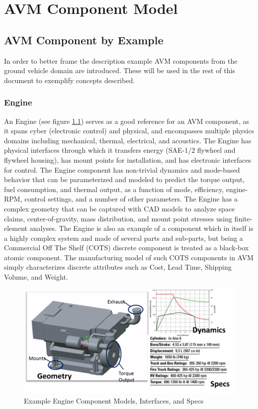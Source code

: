 \chapter{AVM Component Model}

\section{AVM Component by Example}
In order to better frame the description example AVM components from the ground vehicle domain are introduced. These will be used in the rest of this document to exemplify concepts described. 

\subsection{Engine}
An Engine (see figure \ref{Engine_Component}) serves as a good reference for an AVM component, as it spans cyber (electronic control) and physical, and encompasses multiple physics domains including mechanical, thermal, electrical, and acoustics. The Engine has physical interfaces through which it transfers energy (SAE-1/2 flywheel and flywheel housing), has mount points for installation, and has electronic interfaces for control. The Engine component has non-trivial dynamics and mode-based behavior that can be parameterized and modeled to predict the torque output, fuel consumption, and thermal output, as a function of mode, efficiency, engine-RPM, control settings, and a number of other parameters. The Engine has a complex geometry that can be captured with CAD models to analyze space claims, center-of-gravity, mass distribution, and mount point stresses using finite-element analyses. The Engine is also an example of a component which in itself is a highly complex system and made of several parts and sub-parts, but being a Commercial Off The Shelf (COTS) discrete component is treated as a black-box atomic component. The manufacturing model of such COTS components in AVM simply characterizes discrete attributes such as Cost, Lead Time, Shipping Volume, and Weight. 

\begin{figure}
\includegraphics{Engine_Example}
\caption{Example Engine Component Models, Interfaces, and Specs}
\label{Engine_Component}
\end{figure}

